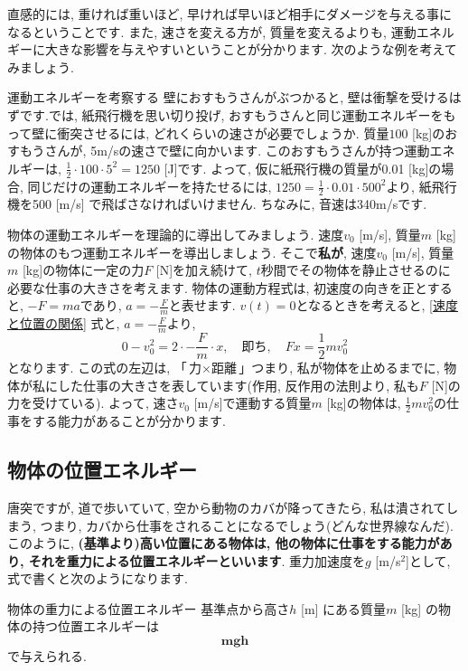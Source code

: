 \documentclass[11pt,dvipdfmx]{jsarticle}
\numberwithin{equation}{section} %
\begin{document}
直感的には, 重ければ重いほど, 早ければ早いほど相手にダメージを与える事になるということです. また, 速さを変える方が, 質量を変えるよりも, 運動エネルギーに大きな影響を与えやすいということが分かります. 次のような例を考えてみましょう. 
\begin{exbox}{運動エネルギーを考察する}
    壁におすもうさんがぶつかると, 壁は衝撃を受けるはずです.では, 紙飛行機を思い切り投げ, おすもうさんと同じ運動エネルギーをもって壁に衝突させるには, どれくらいの速さが必要でしょうか. 質量$100$ [kg]のおすもうさんが, 5m/sの速さで壁に向かいます. このおすもうさんが持つ運動エネルギーは, $\frac{1}{2}\cdot 100 \cdot 5^2 = 1250$ [J]です. よって, 仮に紙飛行機の質量が0.01 [kg]の場合, 同じだけの運動エネルギーを持たせるには, $1250 = \frac{1}{2} \cdot 0.01 \cdot 500^2$より, 紙飛行機を500 [m/s] で飛ばさなければいけません. ちなみに, 音速は340m/sです.
\end{exbox}
物体の運動エネルギーを理論的に導出してみましょう. 
速度$v_{0}$ [m/s], 質量$m$ [kg]の物体のもつ運動エネルギーを導出しましょう. そこで\textbf{私が}, 速度$v_{0}$ [m/s], 質量$m$ [kg]の物体に一定の力$F$ [N]を加え続けて, $t$秒間でその物体を静止させるのに必要な仕事の大きさを考えます. 物体の運動方程式は, 初速度の向きを正とすると, $-F = ma$であり, $a = -\frac{F}{m}$と表せます.  $v(t) = 0$となるときを考えると, 
\eqref{速度と位置の関係} 式と, $a = -\frac{F}{m}$より, 
\begin{equation}
   0 - v_{0}^2 = 2\cdot -\frac{F}{m}\cdot x,\quad 即ち,\quad Fx = \frac{1}{2}mv_{0}^2
\end{equation}
となります. この式の左辺は, 「$\text{力}\times \text{距離}$」つまり, 私が物体を止めるまでに, 物体が私にした仕事の大きさを表しています(作用, 反作用の法則より, 私も$F$ [N]の力を受けている). よって, 速さ$v_{0}$ [m/s]で運動する質量$m$ [kg]の物体は, $\frac{1}{2}mv_{0}^2$の仕事をする能力があることが分かります. 
\subsection{物体の位置エネルギー}
唐突ですが, 道で歩いていて, 空から動物のカバが降ってきたら, 私は潰されてしまう, つまり, カバから仕事をされることになるでしょう(どんな世界線なんだ). このように, \textbf{(基準より)高い位置にある物体は, 他の物体に仕事をする能力があり, それを重力による位置エネルギーといいます}. 重力加速度を$g$ [m/s$^2$]として, 式で書くと次のようになります.
\begin{freebox}{物体の重力による位置エネルギー}
    基準点から高さ$h$ [m] にある質量$m$ [kg] の物体の持つ位置エネルギーは
    \begin{equation}
        \bm{mgh} \label{位置エネルギー}
    \end{equation}
    で与えられる.
\end{freebox}
 
\end{document}
